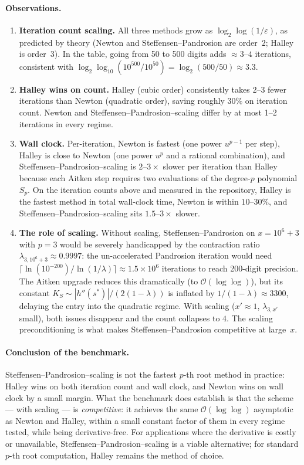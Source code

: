\documentclass[11pt,a4paper]{article}
\theoremstyle{definition}
\begin{document}
\paragraph{Observations.}
\begin{enumerate}
  \item \textbf{Iteration count scaling.} All three methods grow as $\log_2\log(1/\varepsilon)$, as predicted by theory (Newton and Steffensen--Pandrosion are order~$2$; Halley is order~$3$). In the table, going from 50 to 500 digits adds $\approx 3$--$4$ iterations, consistent with $\log_2 \log_{10}(10^{500}/10^{50}) = \log_2(500/50) \approx 3.3$.
  \item \textbf{Halley wins on count.} Halley (cubic order) consistently takes 2--3 fewer iterations than Newton (quadratic order), saving roughly $30\%$ on iteration count. Newton and Steffensen--Pandrosion--scaling differ by at most 1--2 iterations in every regime.
  \item \textbf{Wall clock.} Per-iteration, Newton is fastest (one power $u^{p-1}$ per step), Halley is close to Newton (one power $u^p$ and a rational combination), and Steffensen--Pandrosion--scaling is $2$--$3\times$ slower per iteration than Halley because each Aitken step requires two evaluations of the degree-$p$ polynomial $S_p$. On the iteration counts above and measured in the repository, Halley is the fastest method in total wall-clock time, Newton is within $10$--$30\%$, and Steffensen--Pandrosion--scaling sits $1.5$--$3\times$ slower.
  \item \textbf{The role of scaling.} Without scaling, Steffensen--Pandrosion on $x = 10^6 + 3$ with $p = 3$ would be severely handicapped by the contraction ratio $\lambda_{3, 10^6+3} \approx 0.9997$: the un-accelerated Pandrosion iteration would need $\lceil\ln(10^{-200})/\ln(1/\lambda)\rceil \approx 1.5 \times 10^6$ iterations to reach 200-digit precision. The Aitken upgrade reduces this dramatically (to $\mathcal{O}(\log\log)$), but its constant $K_S \sim |h''(s^*)|/(2(1-\lambda))$ is inflated by $1/(1-\lambda) \approx 3300$, delaying the entry into the quadratic regime. With scaling ($x' \approx 1$, $\lambda_{3, x'}$ small), both issues disappear and the count collapses to $4$. The scaling preconditioning is what makes Steffensen--Pandrosion competitive at large~$x$.
\end{enumerate}

\paragraph{Conclusion of the benchmark.} Steffensen--Pandrosion--scaling is not the fastest $p$-th root method in practice: Halley wins on both iteration count and wall clock, and Newton wins on wall clock by a small margin. What the benchmark does establish is that the scheme --- with scaling --- is \emph{competitive}: it achieves the same $\mathcal{O}(\log\log)$ asymptotic as Newton and Halley, within a small constant factor of them in every regime tested, while being derivative-free. For applications where the derivative is costly or unavailable, Steffensen--Pandrosion--scaling is a viable alternative; for standard $p$-th root computation, Halley remains the method of choice.
\end{document}

